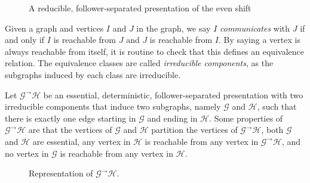 \documentclass[hidelinks]{report}
\newcommand{\Gc}{\mathcal{G}}  %
\newcommand{\Hc}{\mathcal{H}}  %
\newcommand{\GtH}{{\Gc^\to\Hc}}
\newcommand{\term}[1]{\textit{#1}}
\theoremstyle{definition}
\begin{document}
\begin{figure}[h]
    \centering

    \caption{A reducible, follower-separated presentation of the even shift}
    \label{reducibleevenshift}
\end{figure}

Given a graph and vertices \(I\) and \(J\) in the graph, we say \(I\) \term{communicates} with \(J\) if and only if 
\(I\) is reachable from \(J\) and \(J\) is reachable from \(I\). By saying 
a vertex is always reachable from itself, it is routine to check that this defines 
an equivalence relation. The equivalence classes are called \term{irreducible components},
as the subgraphs induced by each class are irreducible.

Let \term{\(\GtH\)} be an essential, deterministic, follower-separated presentation with two irreducible components
that induce two subgraphs, namely \(\Gc\) and \(\Hc\), such that there is 
exactly one edge starting in \(\Gc\) and ending in \(\Hc\). 
Some properties of \(\GtH\) are that the vertices of \(\Gc\) and \(\Hc\)
partition the vertices of \(\GtH\), both \(\Gc\) and \(\Hc\) are essential,  
any vertex in \(\Hc\) is reachable from any vertex in \(\GtH\), and no vertex in \(\Gc\) 
is reachable from any vertex in \(\Hc\). 

\begin{figure}[h]
    \centering
    \caption{Representation of \(\GtH\).}
\end{figure}
\end{document}

